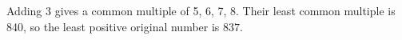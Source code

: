 Adding 3 gives a common multiple of 5, 6, 7, 8. Their least common multiple is 840, so the least positive original number is $\boxed{837}$.
